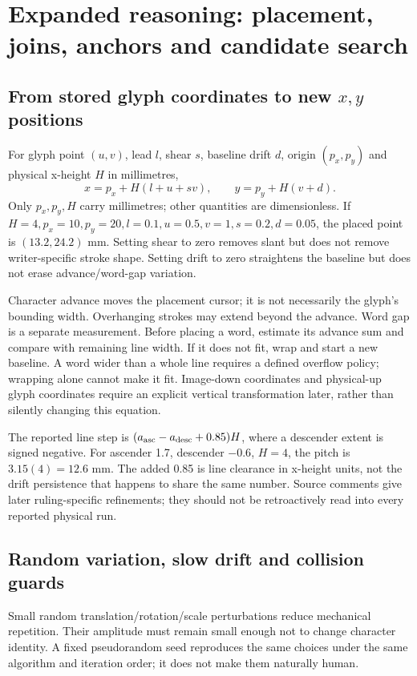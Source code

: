 \section{Expanded reasoning: placement, joins, anchors and candidate search}
\label{sec:expand-synth}
\subsection{From stored glyph coordinates to new $x,y$ positions}
For glyph point $(u,v)$, lead $l$, shear $s$, baseline drift $d$, origin
$(p_x,p_y)$ and physical x-height $H$ in millimetres,
\[
x=p_x+H(l+u+sv),\qquad y=p_y+H(v+d).
\]
Only $p_x,p_y,H$ carry millimetres; other quantities are dimensionless.
If $H=4,p_x=10,p_y=20,l=0.1,u=0.5,v=1,s=0.2,d=0.05$, the placed
point is $(13.2,24.2)$ mm. Setting shear to zero removes slant but does
not remove writer-specific stroke shape. Setting drift to zero straightens
the baseline but does not erase advance/word-gap variation.

Character advance moves the placement cursor; it is not necessarily the
glyph's bounding width. Overhanging strokes may extend beyond the advance.
Word gap is a separate measurement. Before placing a word, estimate its
advance sum and compare with remaining line width. If it does not fit, wrap
and start a new baseline. A word wider than a whole line requires a defined
overflow policy; wrapping alone cannot make it fit. Image-down coordinates
and physical-up glyph coordinates require an explicit vertical transformation
later, rather than silently changing this equation.

The reported line step is $(a_{\rm asc}-a_{\rm desc}+0.85)H$, where a
descender extent is signed negative. For ascender 1.7, descender $-0.6$,
$H=4$, the pitch is $3.15(4)=12.6$ mm. The added 0.85 is line clearance
in x-height units, not the drift persistence that happens to share the same
number. Source comments give later ruling-specific refinements; they should
not be retroactively read into every reported physical run.

\subsection{Random variation, slow drift and collision guards}
Small random translation/rotation/scale perturbations reduce mechanical
repetition. Their amplitude must remain small enough not to change character
identity. A fixed pseudorandom seed reproduces the same choices under the
same algorithm and iteration order; it does not make them naturally human.

